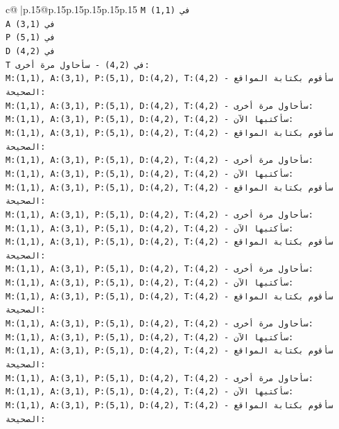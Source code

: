 \documentclass{article}
\begin{document}
{\begin{supertabular}{c@{$\;$}|p{.15\linewidth}@{}p{.15\linewidth}p{.15\linewidth}p{.15\linewidth}p{.15\linewidth}p{.15\linewidth}}
{{{\texttt{M في (1,1)} \\
\texttt{A في (3,1)} \\
\texttt{P في (5,1)} \\
\texttt{D في (4,2)} \\
\texttt{T في (4,2) {-} سأحاول مرة أخرى:} \\
\texttt{M:(1,1), A:(3,1), P:(5,1), D:(4,2), T:(4,2) {-} سأقوم بكتابة المواقع الصحيحة:} \\
\texttt{M:(1,1), A:(3,1), P:(5,1), D:(4,2), T:(4,2) {-} سأحاول مرة أخرى:} \\
\texttt{M:(1,1), A:(3,1), P:(5,1), D:(4,2), T:(4,2) {-} سأكتبها الآن:} \\
\texttt{M:(1,1), A:(3,1), P:(5,1), D:(4,2), T:(4,2) {-} سأقوم بكتابة المواقع الصحيحة:} \\
\texttt{M:(1,1), A:(3,1), P:(5,1), D:(4,2), T:(4,2) {-} سأحاول مرة أخرى:} \\
\texttt{M:(1,1), A:(3,1), P:(5,1), D:(4,2), T:(4,2) {-} سأكتبها الآن:} \\
\texttt{M:(1,1), A:(3,1), P:(5,1), D:(4,2), T:(4,2) {-} سأقوم بكتابة المواقع الصحيحة:} \\
\texttt{M:(1,1), A:(3,1), P:(5,1), D:(4,2), T:(4,2) {-} سأحاول مرة أخرى:} \\
\texttt{M:(1,1), A:(3,1), P:(5,1), D:(4,2), T:(4,2) {-} سأكتبها الآن:} \\
\texttt{M:(1,1), A:(3,1), P:(5,1), D:(4,2), T:(4,2) {-} سأقوم بكتابة المواقع الصحيحة:} \\
\texttt{M:(1,1), A:(3,1), P:(5,1), D:(4,2), T:(4,2) {-} سأحاول مرة أخرى:} \\
\texttt{M:(1,1), A:(3,1), P:(5,1), D:(4,2), T:(4,2) {-} سأكتبها الآن:} \\
\texttt{M:(1,1), A:(3,1), P:(5,1), D:(4,2), T:(4,2) {-} سأقوم بكتابة المواقع الصحيحة:} \\
\texttt{M:(1,1), A:(3,1), P:(5,1), D:(4,2), T:(4,2) {-} سأحاول مرة أخرى:} \\
\texttt{M:(1,1), A:(3,1), P:(5,1), D:(4,2), T:(4,2) {-} سأكتبها الآن:} \\
\texttt{M:(1,1), A:(3,1), P:(5,1), D:(4,2), T:(4,2) {-} سأقوم بكتابة المواقع الصحيحة:} \\
\texttt{M:(1,1), A:(3,1), P:(5,1), D:(4,2), T:(4,2) {-} سأحاول مرة أخرى:} \\
\texttt{M:(1,1), A:(3,1), P:(5,1), D:(4,2), T:(4,2) {-} سأكتبها الآن:} \\
\texttt{M:(1,1), A:(3,1), P:(5,1), D:(4,2), T:(4,2) {-} سأقوم بكتابة المواقع الصحيحة:} \\
}}}
\end{supertabular}}
\end{document}
